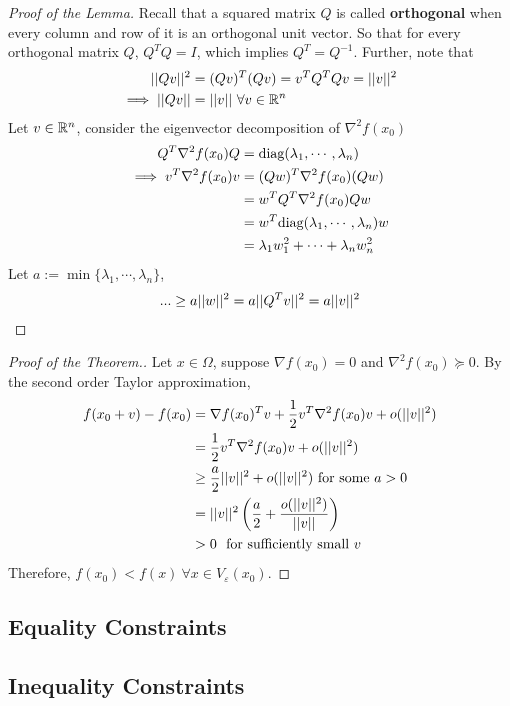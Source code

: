 \documentclass{article}
\begin{document}
   	\begin{proof}[Proof of the Lemma]
   		Recall that a squared matrix $Q$ is called \textbf{orthogonal} when every column and row of it is an orthogonal unit vector. So that for every orthogonal matrix $Q$, $Q^T Q = I$, which implies $Q^T = Q^{-1}$. Further, note that 
   		\begin{align}
   			\vert \vert {Qv} \vert \vert^2 &= (Qv)^T (Qv)
   			= v^T Q^T Q v 
   			= \vert \vert {v} \vert \vert^2 \\
   			\implies \vert \vert {Qv} \vert \vert &= \vert \vert {v} \vert \vert\ \forall v \in \mathbb{R}^n
   		\end{align}
   		Let $v \in \mathbb{R}^n$, consider the eigenvector decomposition of $\nabla^2 f(x_0)$
   		\begin{align}
   			Q^T \nabla^2 f(x_0) Q &= \text{{diag}}(\lambda_1, \cdots, \lambda_n) \\
   			\implies v^T \nabla^2 f(x_0) v &= (Qw)^T \nabla^2 f(x_0) (Qw) \\
   			&= w^T Q^T \nabla^2 f(x_0) Q w \\
   			&= w^T \text{{diag}}(\lambda_1, \cdots, \lambda_n) w \\
   			&= \lambda_1 w_1^2 + \cdots + \lambda_n w_n^2
   		\end{align}
   		Let $a := \min\{\lambda_1, \cdots, \lambda_n\}$,
   		\begin{align}
   			... \geq a \vert \vert {w} \vert \vert^2 = a\vert \vert {Q^T v} \vert \vert^2 = a \vert \vert {v} \vert \vert^2
   		\end{align}
   	\end{proof}
   	
   	\begin{proof}[Proof of the Theorem.]
   		Let $x \in \Omega$, suppose $\nabla f(x_0) = 0$ and $\nabla^2 f(x_0) \succcurlyeq 0$. By the second order Taylor approximation,
   		\begin{align}
   			f(x_0 + v) - f(x_0) &= \nabla f(x_0)^T v + \frac{1}{2} v^T \nabla^2 f(x_0) v + o(\vert \vert {v} \vert \vert^2) \\
   			&= \frac{1}{2} v^T \nabla^2 f(x_0) v + o(\vert \vert {v} \vert \vert^2) \\
   			&\geq \frac{a}{2} \vert \vert {v} \vert \vert^2 + o(\vert \vert {v} \vert \vert^2) \text{{ for some }}a > 0 \\
   			&= \vert \vert {v} \vert \vert^2 \left (
   			\frac{a}{2} + \frac{o(\vert \vert {v} \vert \vert^2)}{\vert \vert {v} \vert \vert} \right) \\
   			&>0\ \text{{ for sufficiently small }} v
   		\end{align}
   		Therefore, $f(x_0) < f(x)\ \forall x \in V_\varepsilon(x_0)$.
   	\end{proof}
   	
   	\subsection{Equality Constraints}
   	
   	\subsection{Inequality Constraints}
\end{document}
